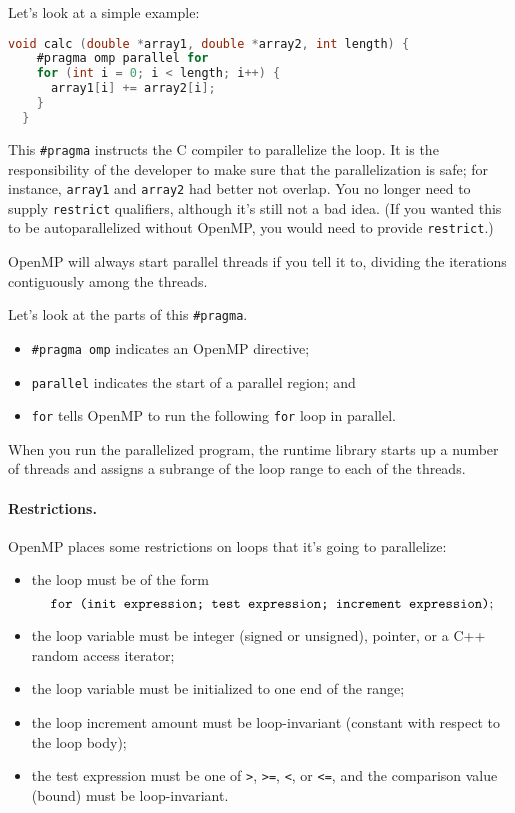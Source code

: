 \documentclass[11pt]{article}
\begin{document}
Let's look at a simple example:
{\small
\begin{lstlisting}[language=C]
  void calc (double *array1, double *array2, int length) {
    #pragma omp parallel for
    for (int i = 0; i < length; i++) {
      array1[i] += array2[i];
    }
  }
\end{lstlisting}
}
This \verb+#pragma+ instructs the C compiler to parallelize the
loop. It is the responsibility of the developer to make sure that
the parallelization is safe; for instance, {\tt array1} and {\tt array2}
had better not overlap. You no longer need to supply {\tt restrict}
qualifiers, although it's still not a bad idea. (If you wanted this
to be autoparallelized without OpenMP, you would need to provide
{\tt restrict}.)

OpenMP will always start parallel threads if you tell it to, dividing
the iterations contiguously among the threads.

Let's look at the parts of this \verb+#pragma+.
\begin{itemize}
\item \verb+#pragma omp+ indicates an OpenMP directive;
\item {\tt parallel} indicates the start of a parallel region; and
\item {\tt for} tells OpenMP to run the following {\tt for} loop in parallel.
\end{itemize}
When you run the parallelized program, the runtime library starts
up a number of threads and assigns a subrange of the loop range to 
each of the threads.

\paragraph{Restrictions.} OpenMP places some restrictions on
loops that it's going to parallelize:
\begin{itemize}
\item the loop must be of the form 
\[ \mbox{\tt for (init expression; test expression; increment expression)}; \]
\item the loop variable must be integer (signed or unsigned), pointer, or a C++
random access iterator;
\item the loop variable must be initialized to one end of the range;
\item the loop increment amount must be loop-invariant (constant with respect to the loop body); 
\item the test expression must be one of {\tt >}, {\tt >=}, {\tt <}, or {\tt <=}, and the comparison value (bound) must be loop-invariant.
\end{itemize}
\end{document}
